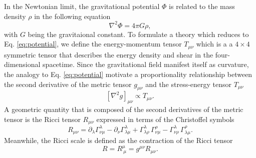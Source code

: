 In the Newtonian limit, the gravitational potential $\Phi$ is related to the mass density $\rho$ in  the following equation
\begin{equation} \label{eq:potential}
    \nabla^2 \Phi = 4\pi G \rho,
\end{equation}
with $G$ being the gravitaional constant. To formulate a theory which reduces to Eq. \ref{eq:potential}, we define the energy-momentum tensor $T_{\mu \nu}$ which is a a $4 \times 4$ symmetric tensor that describes the energy density and shear in the four-dimensional spacetime. Since the gravitational field manifest itself as curvature, the analogy to Eq. \ref{eq:potential} motivate a proportionality relationship between the second derivative of the metric tensor $g_{\mu \nu}$ and the stress-energy tensor $T_{\mu \nu}$ 
\begin{equation}
    \left[ \nabla^2 g \right]_{\mu\nu} \propto T_{\mu\nu}.
\end{equation}
A geometric quantity that is composed of the second derivatives of the metric tensor is the Ricci tensor $R_{\mu \nu}$ expressed in terms of the Christoffel symbols
\begin{equation} \label{eq:Ricci}
    R_{\mu\nu} = \partial_\lambda \Gamma^\lambda_{\nu\mu} 
           - \partial_\nu \Gamma^\lambda_{\lambda\mu} 
           + \Gamma^\lambda_{\lambda\rho}\,\Gamma^\rho_{\nu\mu} 
           - \Gamma^\lambda_{\nu\rho}\,\Gamma^\rho_{\lambda\mu}.
\end{equation}
Meanwhile, the Ricci scale is defined as the contraction of the Ricci tensor
\begin{equation} \label{eq:Ricci_scalar}
    R = R^\mu_{\ \mu} = g^{\mu\nu} R_{\mu\nu}.
\end{equation}


